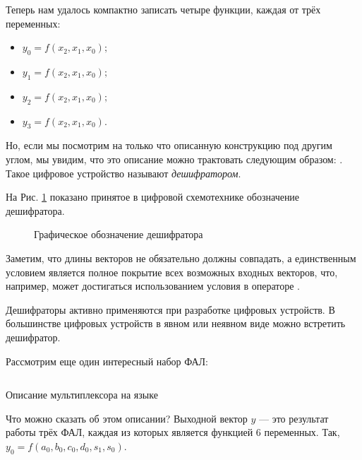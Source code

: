 \par{Теперь нам удалось компактно записать четыре функции, каждая от трёх переменных:
\begin{itemize}%
  \item $y_0=f(x_2,x_1,x_0);$
  \item $y_1=f(x_2,x_1,x_0);$
  \item $y_2=f(x_2,x_1,x_0);$
  \item $y_3=f(x_2,x_1,x_0).$
\end{itemize}}

\par{Но, если мы посмотрим на только что описанную конструкцию под другим углом, мы увидим, что это описание можно трактовать следующим образом: . Такое цифровое устройство называют \emph{дешифратором}.}

\par{На Рис. \ref{fig:decoder} показано принятое в цифровой схемотехнике обозначение дешифратора.}

\begin{figure}[H]
  \centering
  \def\svgwidth{6cm}
  
  \caption{Графическое обозначение дешифратора}
  \label{fig:decoder}
\end{figure}

\par{Заметим, что длины векторов не обязательно должны совпадать, а единственным условием является полное покрытие всех возможных входных векторов, что, например, может достигаться использованием условия  в операторе .}

\par{Дешифраторы активно применяются при разработке цифровых устройств. В большинстве цифровых устройств в явном или неявном виде можно встретить дешифратор.}

\par{Рассмотрим еще один интересный набор ФАЛ:}


\begin{listing}[H]
	\inputminted{SystemVerilog}{code_examples/lab_1/multiplexer.sv}
	\caption{Описание мультиплексора на языке }
\end{listing}

\par{Что можно сказать об этом описании? Выходной вектор $y$ — это результат работы трёх ФАЛ, каждая из которых является функцией 6 переменных. Так, $y_0 = f(a_0, b_0, c_0, d_0, s_1, s_0)$.}

